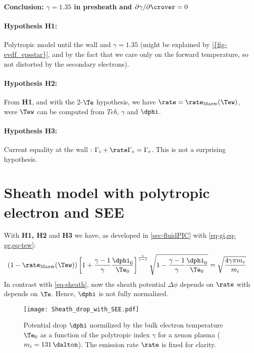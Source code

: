 
\FloatBarrier
{\bf Conclusion: $\gamma = 1.35$ in presheath and $\partial{\gamma} / \partial \crover = 0 $}

\paragraph{Hypothesis H1: } Polytropic model until the wall and $\gamma = 1.35$ (might be explained by \cref{{fig-evdf_epsstar}}, and by the fact that we care only on the forward temperature, so not distorted by the secondary electrons).

\paragraph{Hypothesis H2: } From {\bf H1}, and with the 2-$\Te$ hypothesis, we have $\rate = \rate_{\rm Maxw}(\Tew)$, were $\Tew$ can be computed from $Teb$, $\gamma$ and $\dphi$.

\paragraph{Hypothesis H3: } Current equality at the wall : $\Gamma_i + \rate \Gamma_e = \Gamma_e$. This is not a surprising hypothesis.

\section{Sheath model with polytropic electron and SEE}

With {\bf H1, H2} and {\bf H3} we have, as developed in \cref{sec-fluidPIC} with \cref{eq-gi,eq-ge,eq-tew}:
\begin{equation}\label{eq-sheathsee}
  (1 - \rate_{\rm Maxw}(\Tew) )\left[ 1 +\frac{\gamma -1}{\gamma} \frac{ \dphi_0}{ \Te_0}  \right]^{\frac{1}{\gamma - 1}} \sqrt{1 - \frac{\gamma -1}{\gamma}\frac{\dphi_0}{\Te_0}} = \sqrt{\frac{4 \gamma \pi m_e}{m_i}}
\end{equation}
In contrast with \cref{eq-sheath}, now the sheath potential $\Delta \phi$ depends on $\rate$ with depends on $\Te$.
Hence, $\dphi$ is not fully normalized.

\begin{figure}[hbtp]
  \centering
  \texttt{[image: Sheath\_drop\_with\_SEE.pdf]}
  \caption{Potential drop $\dphi$ normilized by the bulk electron temperature $\Te_0$ as a function of the polytropic index $\gamma$ for a xenon plasma ($m_i = 131\,\dalton$). The emission rate $\rate$ is fixed for clarity.}
  \label{fig-dphi_see}
\end{figure}

